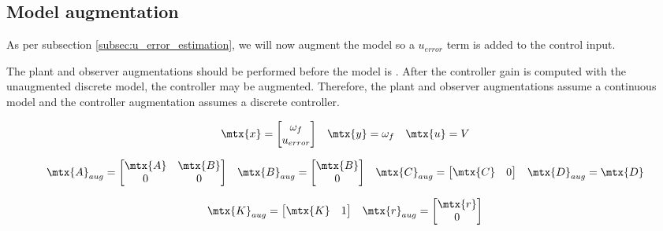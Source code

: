 \subsection{Model augmentation}

As per subsection \ref{subsec:u_error_estimation}, we will now augment the
\gls{model} so a $u_{error}$ term is added to the \gls{control input}.

The \gls{plant} and \gls{observer} augmentations should be performed before the
\gls{model} is . After the \gls{controller}
gain is computed with the unaugmented discrete \gls{model}, the controller may
be augmented. Therefore, the \gls{plant} and \gls{observer} augmentations assume
a continuous \gls{model} and the \gls{controller} augmentation assumes a
discrete \gls{controller}.

\begin{equation*}
  \begin{array}{ccc}
    \mtx{x} =
    \begin{bmatrix}
      \omega_f \\
      u_{error}
    \end{bmatrix} &
    \mtx{y} = \omega_f &
    \mtx{u} = V
  \end{array}
\end{equation*}

\begin{equation}
  \begin{array}{cccc}
    \mtx{A}_{aug} =
    \begin{bmatrix}
      \mtx{A} & \mtx{B} \\
      0 & 0
    \end{bmatrix} &
    \mtx{B}_{aug} =
    \begin{bmatrix}
      \mtx{B} \\
      0
    \end{bmatrix} &
    \mtx{C}_{aug} = \begin{bmatrix}
      \mtx{C} & 0
    \end{bmatrix} &
    \mtx{D}_{aug} = \mtx{D}
  \end{array}
\end{equation}

\begin{equation}
  \begin{array}{cc}
    \mtx{K}_{aug} = \begin{bmatrix}
      \mtx{K} & 1
    \end{bmatrix} &
    \mtx{r}_{aug} = \begin{bmatrix}
      \mtx{r} \\
      0
    \end{bmatrix}
  \end{array}
\end{equation}

